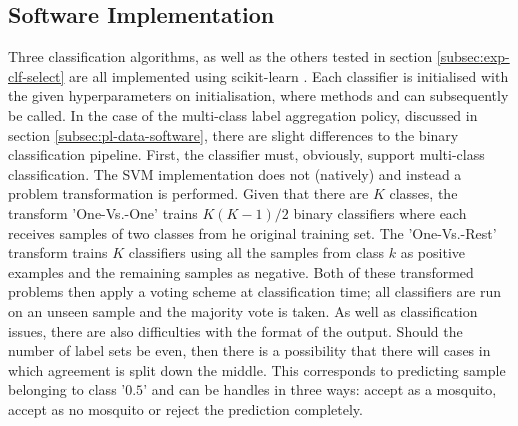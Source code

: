     \subsection{Software Implementation}
    \label{subsec:pl-clf-software}
        Three classification algorithms, as well as the others tested in section \ref{subsec:exp-clf-select} are all implemented using scikit-learn \cite{Pedregosa2012}. Each classifier is initialised with the given hyperparameters on  initialisation, where methods  and  can subsequently be called. In the case of the multi-class label aggregation policy, discussed in section \ref{subsec:pl-data-software}, there are slight differences to the binary classification pipeline. First, the classifier must, obviously, support multi-class classification. The SVM implementation does not (natively) and instead a problem transformation is performed. Given that there are $K$ classes, the transform 'One-Vs.-One' trains $K(K-1)/2$ binary classifiers where each receives samples of two classes from he original training set. The 'One-Vs.-Rest' transform trains $K$ classifiers using all the samples from class $k$ as positive examples and the remaining samples as negative. Both of these transformed problems then apply a voting scheme at classification time; all classifiers are run on an unseen sample and the majority vote is taken. As well as classification issues, there are also difficulties with the format of the output. Should the number of label sets be even, then there is a possibility that there will cases in which agreement is split down the middle. This corresponds to predicting sample belonging to class '$0.5$' and can be handles in three ways: accept as a mosquito, accept as no mosquito or reject the prediction completely.
